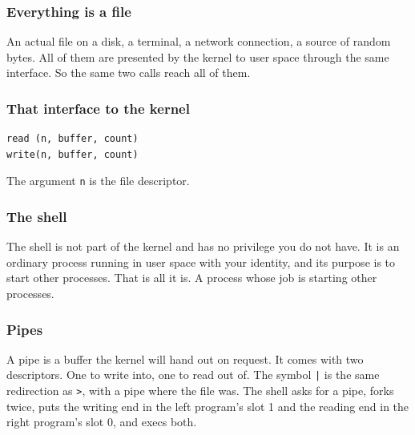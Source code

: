 \documentclass[aspectratio=169,12pt]{beamer}
\begin{document}
\begin{frame}
\frametitle{Everything is a file}
\vfill
\begin{center}
\begin{minipage}{0.92\textwidth}
\raggedright
\large

An actual file on a disk, a terminal, a network connection, a source of random bytes. All of them
are presented by the kernel to user space through the same interface. So the same two calls reach
all of them.

\end{minipage}
\end{center}
\vfill
\end{frame}

\begin{frame}[fragile]
\frametitle{That interface to the kernel}
\vfill
\begin{center}
\begin{minipage}{0.72\textwidth}

\begin{lstlisting}[basicstyle=\ttfamily\large,morekeywords={read,write}]
read (n, buffer, count)
write(n, buffer, count)
\end{lstlisting}

\vspace{1.2em}

{\large The argument \texttt{n} is the file descriptor.\par}

\end{minipage}
\end{center}
\vfill
\end{frame}

\begin{frame}
\frametitle{The shell}
\vfill
\begin{center}
\begin{minipage}{0.92\textwidth}
\raggedright
\large

The shell is not part of the kernel and has no privilege you do not have. It is an ordinary
process running in user space with your identity, and its purpose is to start other processes.
That is all it is. A process whose job is starting other processes.

\end{minipage}
\end{center}
\vfill
\end{frame}

\begin{frame}
\frametitle{Pipes}
\vfill
\begin{center}
\begin{minipage}{0.92\textwidth}
\raggedright
\large

A pipe is a buffer the kernel will hand out on request. It comes with two descriptors. One to
write into, one to read out of. The symbol \texttt{|} is the same redirection as \texttt{>}, with
a pipe where the file was. The shell asks for a pipe, forks twice, puts the writing end in the
left program's slot 1 and the reading end in the right program's slot 0, and execs both.

\end{minipage}
\end{center}
\vfill
\end{frame}
\end{document}

